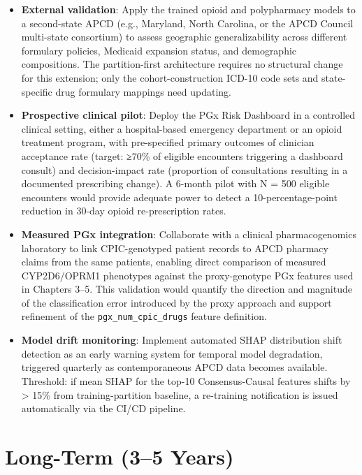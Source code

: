 \documentclass[
  12pt,
]{book}
\begin{document}
\begin{itemize}
\item
  \textbf{External validation}: Apply the trained opioid and
  polypharmacy models to a second-state APCD (e.g., Maryland, North
  Carolina, or the APCD Council multi-state consortium) to assess
  geographic generalizability across different formulary policies,
  Medicaid expansion status, and demographic compositions. The
  partition-first architecture requires no structural change for this
  extension; only the cohort-construction ICD-10 code sets and
  state-specific drug formulary mappings need updating.
\item
  \textbf{Prospective clinical pilot}: Deploy the PGx Risk Dashboard in
  a controlled clinical setting, either a hospital-based emergency
  department or an opioid treatment program, with pre-specified primary
  outcomes of clinician acceptance rate (target: ≥70\% of eligible
  encounters triggering a dashboard consult) and decision-impact rate
  (proportion of consultations resulting in a documented prescribing
  change). A 6-month pilot with N = 500 eligible encounters would
  provide adequate power to detect a 10-percentage-point reduction in
  30-day opioid re-prescription rates.
\item
  \textbf{Measured PGx integration}: Collaborate with a clinical
  pharmacogenomics laboratory to link CPIC-genotyped patient records to
  APCD pharmacy claims from the same patients, enabling direct
  comparison of measured CYP2D6/OPRM1 phenotypes against the
  proxy-genotype PGx features used in Chapters 3--5. This validation
  would quantify the direction and magnitude of the classification error
  introduced by the proxy approach and support refinement of the
  \texttt{pgx\_num\_cpic\_drugs} feature definition.
\item
  \textbf{Model drift monitoring}: Implement automated SHAP distribution
  shift detection as an early warning system for temporal model
  degradation, triggered quarterly as contemporaneous APCD data becomes
  available. Threshold: if mean \textbar SHAP\textbar{} for the top-10
  Consensus-Causal features shifts by \textgreater{} 15\% from
  training-partition baseline, a re-training notification is issued
  automatically via the CI/CD pipeline.
\end{itemize}

\section{Long-Term (3--5 Years)}\label{long-term-35-years}
\end{document}

